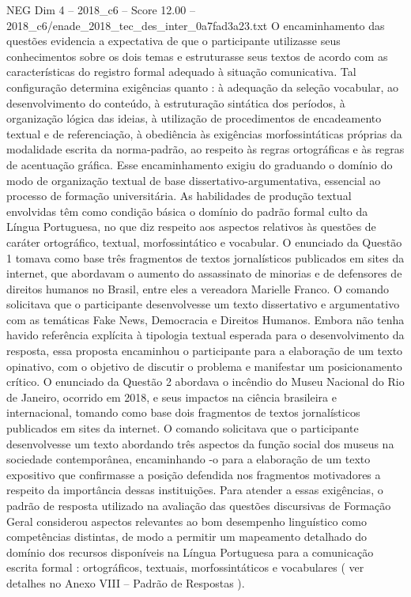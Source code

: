 \begin{textsample}{NEG Dim 4 – 2018\_c6 – Score 12.00 – 2018\_c6/enade\_2018\_tec\_des\_inter\_0a7fad3a23.txt}
O encaminhamento das questões evidencia a expectativa de que o participante utilizasse seus conhecimentos sobre os dois temas e estruturasse seus textos de acordo com as características do registro formal adequado à situação comunicativa.
Tal configuração determina exigências quanto : à adequação da seleção vocabular, ao desenvolvimento do conteúdo, à estruturação sintática dos períodos, à organização lógica das ideias, à utilização de procedimentos de encadeamento textual e de referenciação, à obediência às exigências morfossintáticas próprias da modalidade escrita da norma-padrão, ao respeito às regras ortográficas e às regras de acentuação gráfica.
Esse encaminhamento exigiu do graduando o domínio do modo de organização textual de base dissertativo-argumentativa, essencial ao processo de formação universitária.
As habilidades de produção textual envolvidas têm como condição básica o domínio do padrão formal culto da Língua Portuguesa, no que diz respeito aos aspectos relativos às questões de caráter ortográfico, textual, morfossintático e vocabular.
O enunciado da Questão 1 tomava como base três fragmentos de textos jornalísticos publicados em sites da internet, que abordavam o aumento do assassinato de minorias e de defensores de direitos humanos no Brasil, entre eles a vereadora Marielle Franco.
O comando solicitava que o participante desenvolvesse um texto dissertativo e argumentativo com as temáticas Fake News, Democracia e Direitos Humanos.
Embora não tenha havido referência explícita à tipologia textual esperada para o desenvolvimento da resposta, essa proposta encaminhou o participante para a elaboração de um texto opinativo, com o objetivo de discutir o problema e manifestar um posicionamento crítico.
O enunciado da Questão 2 abordava o incêndio do Museu Nacional do Rio de Janeiro, ocorrido em 2018, e seus impactos na ciência brasileira e internacional, tomando como base dois fragmentos de textos jornalísticos publicados em sites da internet.
O comando solicitava que o participante desenvolvesse um texto abordando três aspectos da função social dos museus na sociedade contemporânea, encaminhando -o para a elaboração de um texto expositivo que confirmasse a posição defendida nos fragmentos motivadores a respeito da importância dessas instituições.
Para atender a essas exigências, o padrão de resposta utilizado na avaliação das questões discursivas de Formação Geral considerou aspectos relevantes ao bom desempenho linguístico como competências distintas, de modo a permitir um mapeamento detalhado do domínio dos recursos disponíveis na Língua Portuguesa para a comunicação escrita formal : ortográficos, textuais, morfossintáticos e vocabulares ( ver detalhes no Anexo VIII – Padrão de Respostas ).

\end{textsample}
